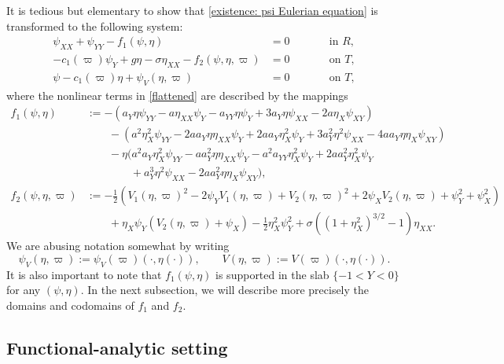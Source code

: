 \documentclass[11pt,reqno]{amsart}
\theoremstyle{plain}
\theoremstyle{remark}
\numberwithin{equation}{section}
\begin{document}
It is tedious but elementary to show that \eqref{existence: psi Eulerian equation} is transformed to the following system:
\begin{subequations}\label{flattened}
  \begin{alignat}{2}
    \label{Laplace}
    \psi_{XX} + \psi_{YY} - f_1(\psi, \eta)&= 0  &\qquad& \textrm{in } R,\\
    \label{Dynamic}
    -c_1(\varpi)\psi_Y + g\eta - \sigma\eta_{XX} - f_2(\psi, \eta ,\varpi) &=   0&& \textrm{on } T,\\
    \label{Kinematic}
    \psi - c_1(\varpi)\eta + \psi_V(\eta,\varpi)&= 0 && \textrm{on } T,
  \end{alignat}
\end{subequations}
where the nonlinear terms in \eqref{flattened} are described by the mappings
\begin{align*}
  f_1(\psi,\eta) &:=
  -(a_Y \eta \psi_{YY} - a \eta_{XX} \psi_Y - a_{YY} \eta \psi_Y
  + 3 a_Y \eta \psi_{XX} - 2 a \eta_X \psi_{XY} )\\
  &\qquad- (a^2 \eta_X^2 \psi_{YY} - 2a a_Y \eta \eta_{XX} \psi_Y + 2 a a_Y
  \eta_X^2 \psi_Y + 3 a_Y^2 \eta^2 \psi_{XX} - 4 a a_Y \eta \eta_X
  \psi_{XY})\\
  &\qquad -\eta (a^2 a_Y \eta_X^2 \psi_{YY} -a a_Y^2 \eta \eta_{XX} \psi_Y -
  a^2 a_{YY} \eta_X^2 \psi_Y + 2a a_Y^2 \eta_X^2 \psi_Y \\
  & \qquad \qquad + a_Y^3 \eta^2
  \psi_{XX} - 2 a a_Y^2 \eta \eta_X \psi_{XY}),\\
  f_2(\psi,\eta,\varpi) &:= 
  -\tfrac 12 \left( V_1(\eta,\varpi)^2 - 2 \psi_Y V_1(\eta,\varpi) + V_2(\eta,\varpi)^2 + 2\psi_X V_2(\eta,\varpi)
  + \psi_Y^2 + \psi_X^2\right) 
  \\ & \qquad
  +\eta_X \psi_Y (V_2(\eta,\varpi) + \psi_X)
  - \tfrac 12 \eta_X^2 \psi_Y^2+ \sigma \left( (1+\eta_X^2)^{3/2} -1 \right) \eta_{XX}.
\end{align*}
We are abusing notation somewhat by writing 
\[ \psi_V(\eta,\varpi) := \psi_V(\varpi)(\cdot, \eta(\cdot)), \qquad V(\eta, \varpi) := V(\varpi)(\cdot, \eta(\cdot)).\]
It is also important to note that  $f_1(\psi, \eta)$ is supported in the slab $\{ -1 < Y < 0\}$ for any $(\psi, \eta)$.  In the next subsection, we will describe more precisely the domains and codomains of $f_1$ and $f_2$.

\subsection{Functional-analytic setting}
\end{document}
